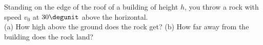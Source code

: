 Standing on the edge of the roof of a building of height $h$,
you throw a rock
with speed $v_0$ at $30\degunit$  above the horizontal.\\
%
(a) How high above the ground does the rock get?\answercheck\hwendpart
%
(b) How far away from the building does the rock land?\answercheck
